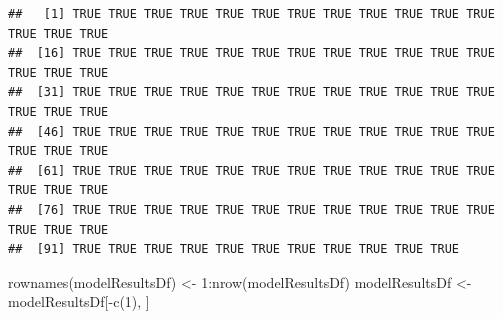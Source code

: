 \documentclass[
]{article}
\newenvironment{Shaded}{\begin{snugshade}}{\end{snugshade}}
\newcommand{\AttributeTok}[1]{\textcolor[rgb]{0.77,0.63,0.00}{#1}}
\newcommand{\CommentTok}[1]{\textcolor[rgb]{0.56,0.35,0.01}{\textit{#1}}}
\newcommand{\ConstantTok}[1]{\textcolor[rgb]{0.00,0.00,0.00}{#1}}
\newcommand{\ControlFlowTok}[1]{\textcolor[rgb]{0.13,0.29,0.53}{\textbf{#1}}}
\newcommand{\DecValTok}[1]{\textcolor[rgb]{0.00,0.00,0.81}{#1}}
\newcommand{\FunctionTok}[1]{\textcolor[rgb]{0.00,0.00,0.00}{#1}}
\newcommand{\NormalTok}[1]{#1}
\newcommand{\OtherTok}[1]{\textcolor[rgb]{0.56,0.35,0.01}{#1}}
\newcommand{\SpecialCharTok}[1]{\textcolor[rgb]{0.00,0.00,0.00}{#1}}
\newcommand{\StringTok}[1]{\textcolor[rgb]{0.31,0.60,0.02}{#1}}
\begin{document}
\begin{Shaded}
\end{Shaded}

\begin{verbatim}
##   [1] TRUE TRUE TRUE TRUE TRUE TRUE TRUE TRUE TRUE TRUE TRUE TRUE TRUE TRUE TRUE
##  [16] TRUE TRUE TRUE TRUE TRUE TRUE TRUE TRUE TRUE TRUE TRUE TRUE TRUE TRUE TRUE
##  [31] TRUE TRUE TRUE TRUE TRUE TRUE TRUE TRUE TRUE TRUE TRUE TRUE TRUE TRUE TRUE
##  [46] TRUE TRUE TRUE TRUE TRUE TRUE TRUE TRUE TRUE TRUE TRUE TRUE TRUE TRUE TRUE
##  [61] TRUE TRUE TRUE TRUE TRUE TRUE TRUE TRUE TRUE TRUE TRUE TRUE TRUE TRUE TRUE
##  [76] TRUE TRUE TRUE TRUE TRUE TRUE TRUE TRUE TRUE TRUE TRUE TRUE TRUE TRUE TRUE
##  [91] TRUE TRUE TRUE TRUE TRUE TRUE TRUE TRUE TRUE TRUE TRUE
\end{verbatim}

\begin{Shaded}
\begin{Highlighting}[]
\FunctionTok{rownames}\NormalTok{(modelResultsDf) }\OtherTok{\textless{}{-}} \DecValTok{1}\SpecialCharTok{:}\FunctionTok{nrow}\NormalTok{(modelResultsDf)}
\NormalTok{modelResultsDf }\OtherTok{\textless{}{-}}\NormalTok{ modelResultsDf[}\SpecialCharTok{{-}}\FunctionTok{c}\NormalTok{(}\DecValTok{1}\NormalTok{), ]}
\end{Highlighting}
\end{Shaded}
\end{document}
